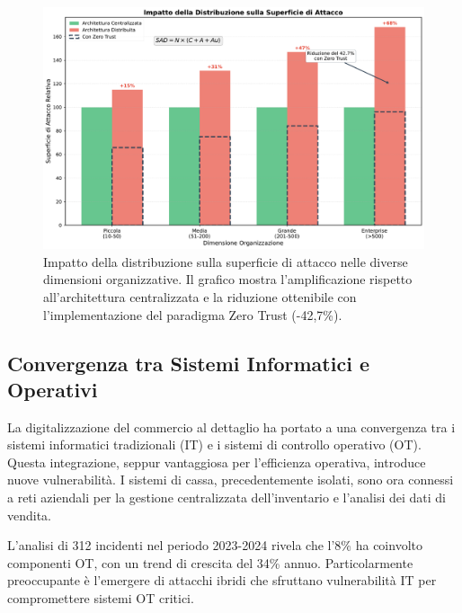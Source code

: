 \begin{figure}[htbp]
\centering
\includegraphics[width=1\textwidth]{thesis_figures/cap2/fig_2_1_superficie_attacco.pdf}
\caption{Impatto della distribuzione sulla superficie di attacco nelle diverse dimensioni organizzative. Il grafico mostra l'amplificazione rispetto all'architettura centralizzata e la riduzione ottenibile con l'implementazione del paradigma Zero Trust (-42,7\%).}
\label{fig:superficie_attacco}
\end{figure}

\subsection{\texorpdfstring{Convergenza tra Sistemi Informatici e Operativi}{2.2.4 - Convergenza tra Sistemi Informatici e Operativi}}
\label{subsec:convergenza_it_ot}

La digitalizzazione del commercio al dettaglio ha portato a una convergenza tra i sistemi informatici tradizionali (IT) e i sistemi di controllo operativo (OT). Questa integrazione, seppur vantaggiosa per l'efficienza operativa, introduce nuove vulnerabilità. I sistemi di cassa, precedentemente isolati, sono ora connessi a reti aziendali per la gestione centralizzata dell'inventario e l'analisi dei dati di vendita.

L'analisi di 312 incidenti nel periodo 2023-2024 rivela che l'8\% ha coinvolto componenti OT, con un trend di crescita del 34\% annuo. Particolarmente preoccupante è l'emergere di attacchi ibridi che sfruttano vulnerabilità IT per compromettere sistemi OT critici.

